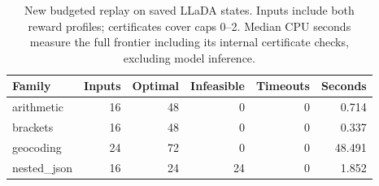 \begin{table}[htbp]
\centering
\caption{New budgeted replay on saved LLaDA states. Inputs include both reward profiles; certificates cover caps 0--2. Median CPU seconds measure the full frontier including its internal certificate checks, excluding model inference.}
\label{tab:budgeted-real}
\begin{tabular}{lrrrrr}
\hline
Family & Inputs & Optimal & Infeasible & Timeouts & Seconds \\
\hline
arithmetic & 16 & 48 & 0 & 0 & 0.714 \\
brackets & 16 & 48 & 0 & 0 & 0.337 \\
geocoding & 24 & 72 & 0 & 0 & 48.491 \\
nested\_json & 16 & 24 & 24 & 0 & 1.852 \\
\hline
\end{tabular}
\end{table}
